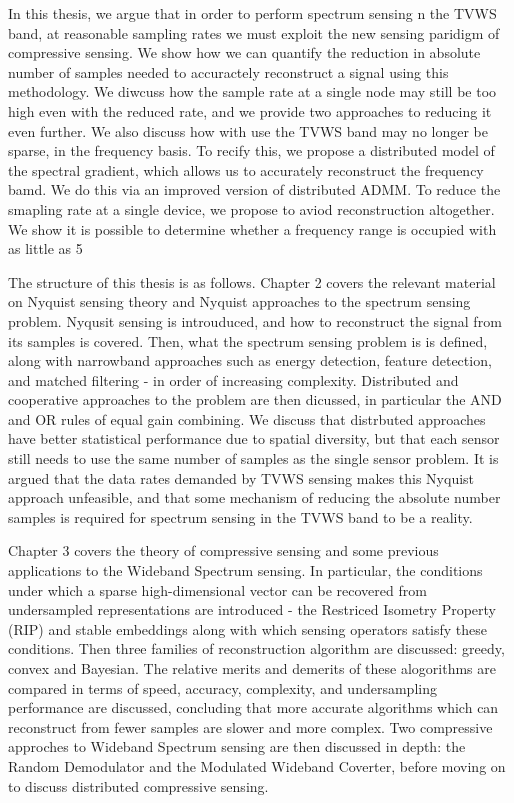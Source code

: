 In this thesis, we argue that in order to perform spectrum sensing n the TVWS band, at reasonable sampling rates we must exploit the new sensing paridigm of compressive sensing. We show how we can quantify the reduction in absolute number of samples needed to accuractely reconstruct a signal using this methodology. We diwcuss how the sample rate at a single node may still be too high even with the reduced rate, and we provide two approaches to reducing it even further. We also  discuss how with use the TVWS band may no longer be sparse, in the frequency basis. To recify this, we propose a distributed model of the spectral gradient, which allows us to accurately reconstruct the frequency bamd. We do this via an improved version of distributed ADMM. To reduce the smapling rate at a single device, we propose to aviod reconstruction altogether. We show it is possible to determine whether a frequency range is occupied with as little as 5%

The structure of this thesis is as follows. Chapter 2 covers the relevant material on Nyquist sensing theory and Nyquist approaches to the spectrum sensing problem. Nyqusit sensing is introuduced, and how to reconstruct the signal from its samples is covered. Then, what the spectrum sensing problem is is defined, along with narrowband approaches such as energy detection, feature detection, and matched filtering - in order of increasing complexity. Distributed and cooperative approaches to the problem are then dicussed, in particular the AND and OR rules of equal gain combining. We discuss that distrbuted approaches have better statistical performance due to spatial diversity, but that each sensor still needs to use the same number of samples as the single sensor problem. It is argued that the data rates demanded by TVWS sensing makes this Nyquist approach unfeasible, and that some mechanism of reducing the absolute number samples is required for spectrum sensing in the TVWS band to be a reality. 

Chapter 3 covers the theory of compressive sensing and some previous applications to the Wideband Spectrum sensing. In particular, the conditions under which a sparse high-dimensional vector can be recovered from undersampled representations are introduced - the Restriced Isometry Property (RIP) and stable embeddings along with which sensing operators satisfy these conditions. Then three families of reconstruction algorithm are discussed: greedy, convex and Bayesian. The relative merits and demerits of these alogorithms are compared in terms of speed, accuracy, complexity, and undersampling performance are discussed, concluding that more accurate algorithms which can reconstruct from fewer samples are slower and more complex. Two compressive approches to Wideband Spectrum sensing are then discussed in depth: the Random Demodulator and the Modulated Wideband Coverter, before moving on to discuss distributed compressive sensing.  

